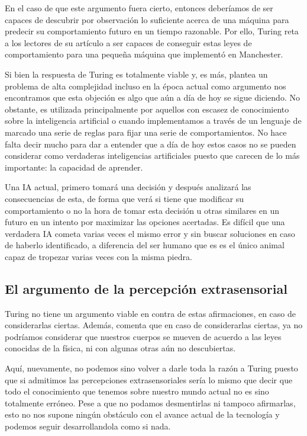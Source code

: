 \documentclass[12pt,a4paper]{article}
\begin{document}
En el caso de que este argumento fuera cierto, entonces deberíamos de ser capaces de descubrir por observación lo suficiente acerca de una máquina para predecir su comportamiento futuro en un tiempo razonable. Por ello, Turing reta a los lectores de su artículo a ser capaces de conseguir estas leyes de comportamiento para una pequeña máquina que implementó en Manchester.

Si bien la respuesta de Turing es totalmente viable y, es más, plantea un problema de alta complejidad incluso en la época actual como argumento nos encontramos que esta objeción es algo que aún a día de hoy se sigue diciendo. No obstante, es utilizada principalmente por aquellos con escasez de conocimiento sobre la inteligencia artificial o cuando implementamos a través de un lenguaje de marcado una serie de reglas para fijar una serie de comportamientos. No hace falta decir mucho para dar a entender que a día de hoy estos casos no se pueden considerar como verdaderas inteligencias artificiales puesto que carecen de lo más importante: la capacidad de aprender.

Una IA actual, primero tomará una decisión y después analizará las consecuencias de esta, de forma que verá si tiene que modificar su comportamiento o no la hora de tomar esta decisión u otras similares en un futuro en un intento por maximizar las opciones acertadas. Es difícil que una verdadera IA cometa varias veces el mismo error y sin buscar soluciones en caso de haberlo identificado, a diferencia del ser humano que es es el único animal capaz de tropezar varias veces con la misma piedra.

\subsection{El argumento de la percepción extrasensorial}
Turing no tiene un argumento viable en contra de estas afirmaciones, en caso de considerarlas ciertas. Además, comenta que en caso de considerarlas ciertas, ya no podríamos considerar que nuestros cuerpos se mueven de acuerdo a las leyes conocidas de la física, ni con algunas otras aún no descubiertas.

Aquí, nuevamente, no podemos sino volver a darle toda la razón a Turing puesto que si admitimos las percepciones extrasensoriales sería lo mismo que decir que todo el conocimiento que tenemos sobre nuestro mundo actual no es sino totalmente erróneo. Pese a que no podamos desmentirlas ni tampoco afirmarlas, esto no nos supone ningún obstáculo con el avance actual de la tecnología y podemos seguir desarrollandola como si nada.
\end{document}
